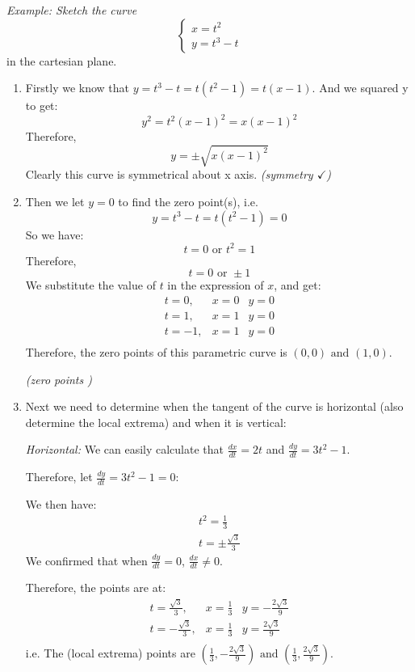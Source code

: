 \documentclass[12pt]{report}
\begin{document}
\emph{Example: Sketch the curve}
$$
\left\{\begin{array}{ll}
x = t^2 
\\ y = t^3 - t
\end{array}\right.
$$
\indent in the cartesian plane.

\begin{enumerate}
    \item Firstly we know that $y = t^3 - t = t(t^2 - 1) = t(x - 1)$.
    \newline And we squared y to get:
    $$
    y^2 = t^2(x - 1)^2 = x(x - 1)^2
    $$
    Therefore, 
    $$
    y = \pm \sqrt{x(x - 1)^2}
    $$
    Clearly this curve is symmetrical about x axis. \emph{(symmetry $\checkmark$)}
    \item Then we let $y = 0$ to find the zero point(s), i.e.
    $$
    y = t^3 - t = t(t^2 - 1) = 0
    $$
    So we have:
    $$
    t = 0 \text{ or } t^2 = 1
    $$
    Therefore, $$
    t = 0 \text{ or } \pm 1
    $$
    We substitute the value of $t$ in the expression of $x$, and get:
    $$
    \begin{array}{lll}
        t = 0, & x = 0 & y = 0 \\
        t = 1, & x = 1 & y = 0 \\
        t = -1, & x = 1 & y = 0 \\
    \end{array}
    $$
    Therefore, the zero points of this parametric curve is $(0, 0) \text{ and } (1, 0)$.
    
    \emph{(zero points \checkmark)}

    \item Next we need to determine when the tangent of the curve is horizontal 
    (also determine the local extrema) and when it is vertical:

    \emph{Horizontal:} We can easily calculate that $\frac{dx}{dt} = 2t$ and $\frac{dy}{dt} = 3t^2 - 1$.

    Therefore, let $\frac{dy}{dt} = 3t^2 - 1 = 0$:
    
    We then have:
    $$
    \begin{array}{l}
        t^2 = \frac{1}{3} \\
        t = \pm \frac{\sqrt{3}}{3}
    \end{array}
    $$
    We confirmed that when $\frac{dy}{dt} = 0$, $\frac{dx}{dt} \neq 0$.

    Therefore, the points are at:
    $$
    \begin{array}{lll}
        t = \frac{\sqrt{3}}{3}, & x = \frac{1}{3} & y = -\frac{2 \sqrt{3}}{9} \\
        t = -\frac{\sqrt{3}}{3}, & x = \frac{1}{3} & y = \frac{2 \sqrt{3}}{9} \\
    \end{array}
    $$
    i.e. The (local extrema) points are $(\frac{1}{3}, -\frac{2\sqrt{3}}{9}) \text{ and } (\frac{1}{3}, \frac{2\sqrt{3}}{9})$.
    

\end{enumerate}
\end{document}
